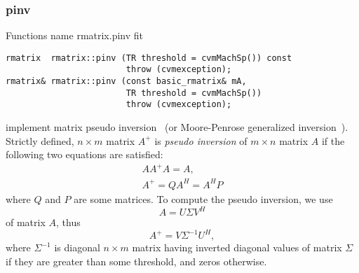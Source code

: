 \subsubsection{pinv}
Functions%
\pdfdest name {rmatrix.pinv} fit
\begin{verbatim}
rmatrix  rmatrix::pinv (TR threshold = cvmMachSp()) const 
                        throw (cvmexception);
rmatrix& rmatrix::pinv (const basic_rmatrix& mA, 
                        TR threshold = cvmMachSp()) 
                        throw (cvmexception);
\end{verbatim}
implement matrix pseudo inversion~
(or Moore-Penrose generalized inversion~).
Strictly defined,  $n\times m$ matrix $A^{+}$ is 
\textit{pseudo inversion} of $m\times n$ matrix $A$ if the following two equations
are satisfied:
\begin{gather*}
AA^{+}A=A,\\
A^{+}=QA^H=A^HP
\end{gather*}
where $Q$ and $P$ are some matrices. To compute the pseudo inversion, we use
\begin{equation*}
A = U\Sigma V^H
\end{equation*}
of matrix $A$, thus
\begin{equation*}
A^{+} = V\Sigma^{-1}U^{H},
\end{equation*}
where $\Sigma^{-1}$ is  diagonal $n\times m$ matrix having inverted
diagonal values of  matrix $\Sigma$ if they are greater than some threshold,
and zeros otherwise.

